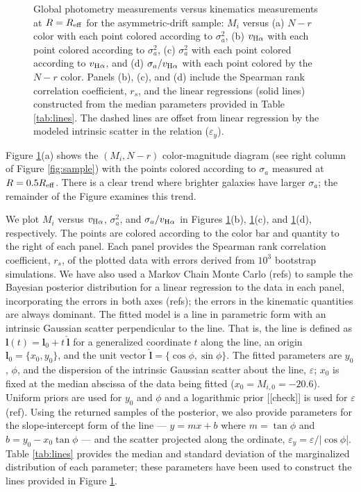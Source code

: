 \documentclass[apj,iop,revtex4,numberedappendix]{emulateapj}
\begin{document}
\begin{figure}
\begin{center}
%
\end{center}
%
\caption{
%
Global photometry measurements versus kinematics measurements at
$R=R_{\rm eff}$ for the asymmetric-drift sample: $M_i$ versus (a) $N-r$
color with each point colored according to $\sigma_a^2$, (b) $v_{{\rm
H}\alpha}$ with each point colored according to $\sigma_a^2$, (c)
$\sigma_a^2$ with each point colored according to $v_{{\rm H}\alpha}$,
and (d) $\sigma_a/v_{{\rm H}\alpha}$ with each point colored by the
$N-r$ color.  Panels (b), (c), and (d) include the Spearman rank
correlation coefficient, $r_s$, and the linear regressions (solid lines)
constructed from the median parameters provided in Table
\ref{tab:lines}.  The dashed lines are offset from linear regression by
the modeled intrinsic scatter in the relation ($\varepsilon_y$).
%
}
%
\label{fig:correlation}
%
\end{figure}

Figure \ref{fig:correlation}(a) shows the $(M_i, N-r)$ color-magnitude
diagram (see right column of Figure \ref{fig:sample}) with the points
colored according to $\sigma_a$ measured at $R=0.5R_{\rm eff}$.  There
is a clear trend where brighter galaxies have larger $\sigma_a$; the
remainder of the Figure examines this trend.

We plot $M_i$ versus $v_{{\rm H}\alpha}$, $\sigma_a^2$, and
$\sigma_a/v_{{\rm H}\alpha}$ in Figures \ref{fig:correlation}(b),
\ref{fig:correlation}(c), and \ref{fig:correlation}(d), respectively.
The points are colored according to the color bar and quantity to the
right of each panel.  Each panel provides the Spearman rank correlation
coefficient, $r_s$, of the plotted data with errors derived from $10^3$
bootstrap simulations.  We have also used a Markov Chain Monte Carlo
(refs) to sample the Bayesian posterior distribution for a linear
regression to the data in each panel, incorporating the errors in both
axes (refs); the errors in the kinematic quantities are always dominant.
The fitted model is a line in parametric form with an intrinsic Gaussian
scatter perpendicular to the line.  That is, the line is defined as
$\mathbf{l}(t) = \mathbf{l}_0 + t\ \hat{\mathbf{l}}$ for a generalized
coordinate $t$ along the line, an origin $\mathbf{l}_0 = \{x_0, y_0\}$,
and the unit vector $\hat{\mathbf{l}} = \{\cos\phi, \sin\phi\}$.  The
fitted parameters are $y_0$, $\phi$, and the dispersion of the intrinsic
Gaussian scatter about the line, $\varepsilon$; $x_0$ is fixed at the
median abscissa of the data being fitted ($x_0 = M_{i,0} = -20.6$).
Uniform priors are used for $y_0$ and $\phi$ and a logarithmic prior
[[check]] is used for $\varepsilon$ (ref).  Using the returned samples
of the posterior, we also provide parameters for the slope-intercept
form of the line --- $y = mx + b$ where $m = \tan\phi$ and $b = y_0 -
x_0 \tan\phi$ --- and the scatter projected along the ordinate,
$\varepsilon_y = \varepsilon/|\cos\phi$|.  Table \ref{tab:lines}
provides the median and standard deviation of the marginalized
distribution of each parameter; these parameters have been used to
construct the lines provided in Figure \ref{fig:correlation}.
\end{document}

